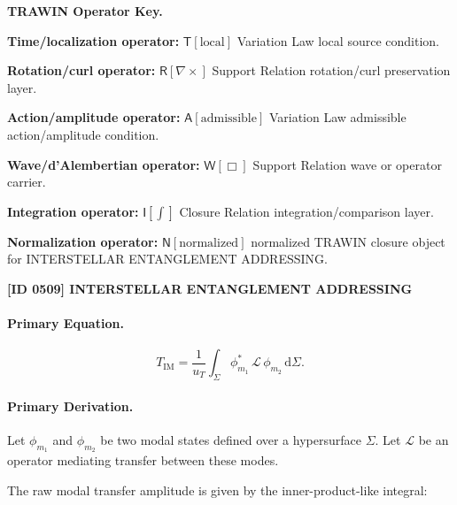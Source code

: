 \par\vspace{0.45\baselineskip}
\noindent\begin{minipage}[t]{\linewidth}
\begingroup
\small
\raggedright
\textbf{TRAWIN Operator Key.}\par
\noindent\textbf{Time/localization operator:} $\mathsf{T}\!\left[\mathrm{local}\right]$ Variation Law local source condition.\par
\noindent\textbf{Rotation/curl operator:} $\mathsf{R}\!\left[\nabla\times\right]$ Support Relation rotation/curl preservation layer.\par
\noindent\textbf{Action/amplitude operator:} $\mathsf{A}\!\left[\mathrm{admissible}\right]$ Variation Law admissible action/amplitude condition.\par
\noindent\textbf{Wave/d'Alembertian operator:} $\mathsf{W}\!\left[\Box\right]$ Support Relation wave or operator carrier.\par
\noindent\textbf{Integration operator:} $\mathsf{I}\!\left[\int\right]$ Closure Relation integration/comparison layer.\par
\noindent\textbf{Normalization operator:} $\mathsf{N}\!\left[\mathrm{normalized}\right]$ normalized TRAWIN closure object for INTERSTELLAR ENTANGLEMENT ADDRESSING.\par
\endgroup
\end{minipage}

\clearpage
\noindent\textbf{[ID 0509] INTERSTELLAR ENTANGLEMENT ADDRESSING}\par
\vspace{0.35em}
\paragraph{Primary Equation.}
\begin{equation}
T_{\mathrm{IM}}
=
\frac{1}{u_T}
\int_{\Sigma}
\phi_{m_1}^{*}
\,\mathcal{L}\,
\phi_{m_2}
\,\mathrm{d}\Sigma .
\end{equation}

\paragraph{Primary Derivation.}
Let $\phi_{m_1}$ and $\phi_{m_2}$ be two modal states defined over a hypersurface $\Sigma$.  
Let $\mathcal{L}$ be an operator mediating transfer between these modes.

The raw modal transfer amplitude is given by the inner-product-like integral:

